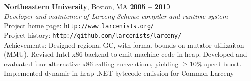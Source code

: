 \documentclass[margin,line,draft]{res}
\def\noneed#1{}
\begin{document}
\begin{resume}
    \textbf{Northeastern University}, Boston, MA \hfill \textbf{2005 -- 2010}\\\vspace{1mm}%
    \textsl{Developer and maintainer of Larceny Scheme compiler and runtime system} \\
    Project home page: {\tt http://www.larcenists.org/} \\
    Project history: {\tt http://github.com/larcenists/larceny/}\\
    Achievements: Designed regional GC, with formal bounds on mutator utilizaiton (MMU). Revised Intel x86 backend to emit machine code in-heap. Developed and evaluated four alternative x86 calling conventions, yielding $\geq 10\%$ speed boost. Implemented dynamic in-heap .NET bytecode emission for Common Larceny.
    \vspace{-2mm}
% 
% 
% 
% 
% 


\end{resume}
\end{document}
